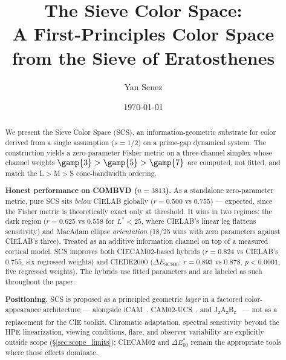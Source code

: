 \documentclass[12pt,a4paper]{article}
\title{The Sieve Color Space:\\
A First-Principles Color Space from the Sieve of Eratosthenes}
\author{Yan Senez}
\date{\today}
\begin{document}
\maketitle

\begin{abstract}
We present the Sieve Color Space (SCS), an information-geometric
substrate for color derived from a single assumption ($s = 1/2$) on a
prime-gap dynamical system. The construction yields a zero-parameter
Fisher metric on a three-channel simplex whose channel weights
$\gamp{3} > \gamp{5} > \gamp{7}$ are computed, not fitted, and match
the L$>$M$>$S cone-bandwidth ordering.

\medskip\noindent\textbf{Honest performance on COMBVD ($n = 3813$).}
As a standalone zero-parameter metric, pure SCS sits \emph{below}
CIELAB globally ($r = 0.500$ vs $0.755$) --- expected, since the
Fisher metric is theoretically exact only at threshold. It wins in
two regimes: the dark region ($r = 0.625$ vs $0.558$ for $L^* < 25$,
where CIELAB's linear leg flattens sensitivity) and MacAdam ellipse
\emph{orientation} (18/25 wins with zero parameters against CIELAB's
three). Treated as an additive information channel on top of a
measured cortical model, SCS improves both CIECAM02-based hybrids
($r = 0.824$ vs CIELAB's $0.755$, six regressed weights) and
CIEDE2000 ($\Delta E_{\mathrm{SCS00}}$: $r = 0.893$ vs $0.878$,
$p < 0.0001$, five regressed weights). The hybrids use fitted
parameters and are labeled as such throughout the paper.

\medskip\noindent\textbf{Positioning.} SCS is proposed as a principled
geometric \emph{layer} in a factored color-appearance architecture ---
alongside iCAM~\cite{fairchildjohnson2004}, CAM02-UCS~\cite{luo2006}, and
J\textsubscript{z}A\textsubscript{z}B\textsubscript{z}~\cite{safdar2017}
--- not as a replacement for the CIE toolkit.
Chromatic adaptation, spectral sensitivity beyond the HPE
linearization, viewing conditions, flare, and observer variability
are explicitly outside scope (\S\ref{sec:scope_limits}); CIECAM02 and
$\Delta E^*_{00}$ remain the appropriate tools where those effects
dominate.


\end{abstract}
\end{document}
